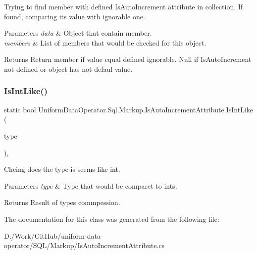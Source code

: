 Trying to find member with defined Is\+Auto\+Increment attribute in collection. If found, comparing it\textquotesingle{}s value with ignorable one. 


\begin{DoxyParams}{Parameters}
{\em data} & Object that contain member.\\
\hline
{\em members} & List of members that would be checked for this object.\\
\hline
\end{DoxyParams}
\begin{DoxyReturn}{Returns}
Return member if value equal defined ignorable. Null if Is\+Auto\+Increment not defined or object has not defaul value.
\end{DoxyReturn}
\mbox{\label{class_uniform_data_operator_1_1_sql_1_1_markup_1_1_is_auto_increment_attribute_a922a00a448b76833772358145b830403}} 
\subsubsection{\texorpdfstring{Is\+Int\+Like()}{IsIntLike()}}
{\footnotesize\ttfamily static bool Uniform\+Data\+Operator.\+Sql.\+Markup.\+Is\+Auto\+Increment\+Attribute.\+Is\+Int\+Like (\begin{DoxyParamCaption}\item[{Type}]{type }\end{DoxyParamCaption})\hspace{0.3cm}{\ttfamily [static]}, {\ttfamily [protected]}}



Cheing does the type is seems like int. 


\begin{DoxyParams}{Parameters}
{\em type} & Type that would be comparet to ints.\\
\hline
\end{DoxyParams}
\begin{DoxyReturn}{Returns}
Result of types commpession.
\end{DoxyReturn}


The documentation for this class was generated from the following file\+:\begin{DoxyCompactItemize}
\item 
D\+:/\+Work/\+Git\+Hub/uniform-\/data-\/operator/\+S\+Q\+L/\+Markup/Is\+Auto\+Increment\+Attribute.\+cs\end{DoxyCompactItemize}
